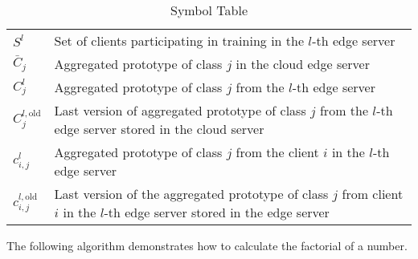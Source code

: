 \documentclass{article}
\begin{document}
\begin{table}[H]
\begin{tabular}{@{}lp{10cm}@{}}
        \( S^{l} \)                           & Set of clients participating in training in the \( l \)-th edge server                                                                \\
        \( \bar{C}_j \)                       & Aggregated prototype of class $j$ in the cloud edge server                                                                            \\
        \( C^l_j \)                           & Aggregated prototype of class $j$ from the \( l \)-th edge server                                                                     \\
        \( C^{l,\text{old}}_j \)              & Last version of aggregated prototype of class $j$ from the \( l \)-th edge server stored in the cloud server                          \\
        \( c^l_{i, j} \)                      & Aggregated prototype of class $j$ from the client \(i\) in  the \( l \)-th edge server                                                \\
        \( c_{i, j}^{l, \text{old}} \)        & Last version of the aggregated prototype of class \( j \) from client \( i \) in the \( l \)-th edge server stored in the edge server \\
        \bottomrule
    \end{tabular}
    \caption{Symbol Table}
\end{table}

The following algorithm demonstrates how to calculate the factorial of a number.
\end{document}
